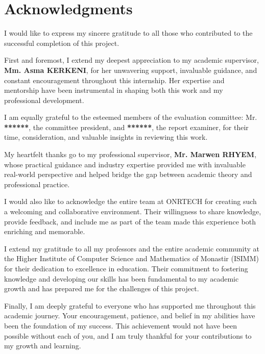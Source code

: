 \chapter*{Acknowledgments}

I would like to express my sincere gratitude to all those who contributed to the successful completion of this project.

First and foremost, I extend my deepest appreciation to my academic supervisor, \textbf{Mm. Asma KERKENI}, for her unwavering support, invaluable guidance, and constant encouragement throughout this internship. Her expertise and mentorship have been instrumental in shaping both this work and my professional development.

I am equally grateful to the esteemed members of the evaluation committee: Mr. \textbf{******}, the committee president, and \textbf{******}, the report examiner, for their time, consideration, and valuable insights in reviewing this work.

My heartfelt thanks go to my professional supervisor, \textbf{Mr. Marwen RHYEM}, whose practical guidance and industry expertise provided me with invaluable real-world perspective and helped bridge the gap between academic theory and professional practice.

I would also like to acknowledge the entire team at ONRTECH for creating such a welcoming and collaborative environment. Their willingness to share knowledge, provide feedback, and include me as part of the team made this experience both enriching and memorable.

I extend my gratitude to all my professors and the entire academic community at the Higher Institute of Computer Science and Mathematics of Monastir (ISIMM) for their dedication to excellence in education. Their commitment to fostering knowledge and developing our skills has been fundamental to my academic growth and has prepared me for the challenges of this project.

Finally, I am deeply grateful to everyone who has supported me throughout this academic journey. Your encouragement, patience, and belief in my abilities have been the foundation of my success. This achievement would not have been possible without each of you, and I am truly thankful for your contributions to my growth and learning.